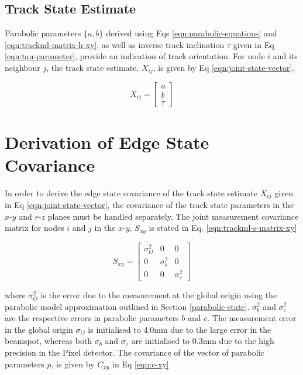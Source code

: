 \subsection{Track State Estimate}

Parabolic parameters $\{a, b\}$ derived using Eqs \eqref{eqn:parabolic-equations} and \eqref{eqn:trackml-matrix-h-xy}, as well as inverse track inclination $\tau$ given in Eq \eqref{eqn:tau-parameter}, provide an indication of track orientation. For node $i$ and its neighbour $j$, the track state estimate, $X_{ij}$, is given by Eq \eqref{eqn:joint-state-vector}.

\begin{equation}
X_{ij} = \begin{bmatrix} a \\ b \\ \tau \end{bmatrix}
\label{eqn:joint-state-vector}
\end{equation}







\section{Derivation of Edge State Covariance}
\label{chapter-6-covariance-derivation}

In order to derive the edge state covariance of the track state estimate $X_{ij}$ given in Eq \eqref{eqn:joint-state-vector}, the covariance of the track state parameters in the $x$-$y$ and $r$-$z$ planes must be handled separately. The joint measurement covariance matrix for nodes $i$ and $j$ in the $x$-$y$, $S_{xy}$ is stated in Eq. \eqref{eqn:trackml-s-matrix-xy}

\begin{equation}
    S_{xy} = \begin{bmatrix} \sigma_O^{2} & 0 & 0 \\ 0 & \sigma_b^{2} & 0 \\ 0 & 0 & \sigma_c^{2} \end{bmatrix} 
    \label{eqn:trackml-s-matrix-xy}
\end{equation}

where $\sigma_O^{2}$ is the error due to the measurement at the global origin using the parabolic model approximation outlined in Section \ref{parabolic-state}. $\sigma_b^{2}$ and $\sigma_c^{2}$ are the respective errors in parabolic parameters $b$ and $c$. The measurement error in the global origin $\sigma_O$ is initialised to 4.0mm due to the large error in the beamspot, whereas both $\sigma_b$ and $\sigma_c$ are initialised to 0.3mm due to the high precision in the Pixel detector. The covariance of the vector of parabolic parameters $\hat{p}$, is given by $C_{xy}$ in Eq \eqref{eqn:c-xy}

